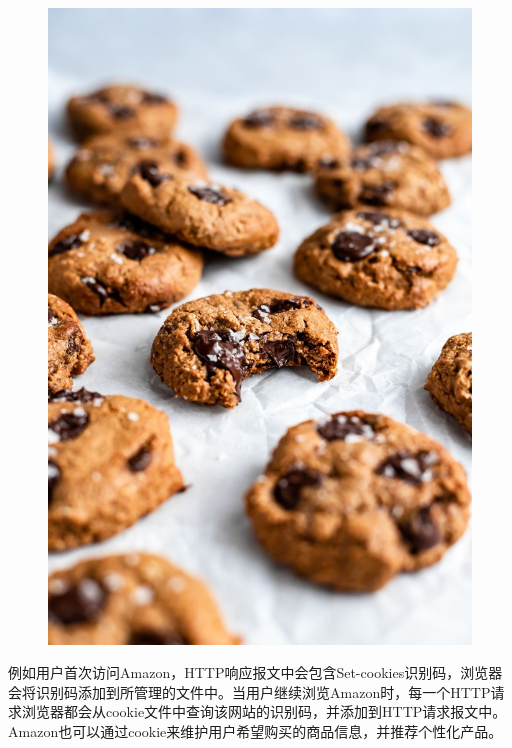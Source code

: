\begin{figure}[H]
    \centering
    \includegraphics[scale=0.15]{img/Chapter2/2-3/1.png}
\end{figure}

例如用户首次访问Amazon，HTTP响应报文中会包含Set-cookies识别码，浏览器会将识别码添加到所管理的文件中。当用户继续浏览Amazon时，每一个HTTP请求浏览器都会从cookie文件中查询该网站的识别码，并添加到HTTP请求报文中。Amazon也可以通过cookie来维护用户希望购买的商品信息，并推荐个性化产品。

